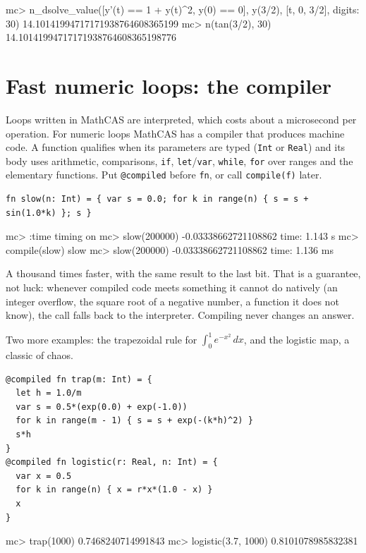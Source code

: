 \documentclass[11pt,a4paper]{article}
\newcommand{\code}[1]{\texttt{#1}}
\begin{document}
\begin{repl}
mc> n_dsolve_value([y'(t) == 1 + y(t)^2, y(0) == 0], y(3/2), [t, 0, 3/2], digits: 30)
14.10141994717171938764608365199
mc> n(tan(3/2), 30)
14.10141994717171938764608365198776
\end{repl}

\section{Fast numeric loops: the compiler}

Loops written in MathCAS are interpreted, which costs about a microsecond per operation. For numeric loops
MathCAS has a compiler that produces machine code. A function qualifies when its parameters are typed
(\code{Int} or \code{Real}) and its body uses arithmetic, comparisons, \code{if}, \code{let}/\code{var},
\code{while}, \code{for} over ranges and the elementary functions. Put \code{@compiled} before \code{fn}, or call
\code{compile(f)} later.

\begin{lstlisting}
fn slow(n: Int) = { var s = 0.0; for k in range(n) { s = s + sin(1.0*k) }; s }
\end{lstlisting}
\begin{repl}
mc> :time
timing on
mc> slow(200000)
-0.03338662721108862
time: 1.143 s
mc> compile(slow)
slow
mc> slow(200000)
-0.03338662721108862
time: 1.136 ms
\end{repl}

\noindent A thousand times faster, with the same result to the last bit. That is a guarantee, not luck:
whenever compiled code meets something it cannot do natively (an integer overflow, the square root of a
negative number, a function it does not know), the call falls back to the interpreter. Compiling never
changes an answer.

Two more examples: the trapezoidal rule for $\int_0^1 e^{-x^2}\,dx$, and the logistic map, a classic of chaos.

\begin{lstlisting}
@compiled fn trap(m: Int) = {
  let h = 1.0/m
  var s = 0.5*(exp(0.0) + exp(-1.0))
  for k in range(m - 1) { s = s + exp(-(k*h)^2) }
  s*h
}
@compiled fn logistic(r: Real, n: Int) = {
  var x = 0.5
  for k in range(n) { x = r*x*(1.0 - x) }
  x
}
\end{lstlisting}
\begin{repl}
mc> trap(1000)
0.7468240714991843
mc> logistic(3.7, 1000)
0.8101078985832381
\end{repl}
\end{document}
